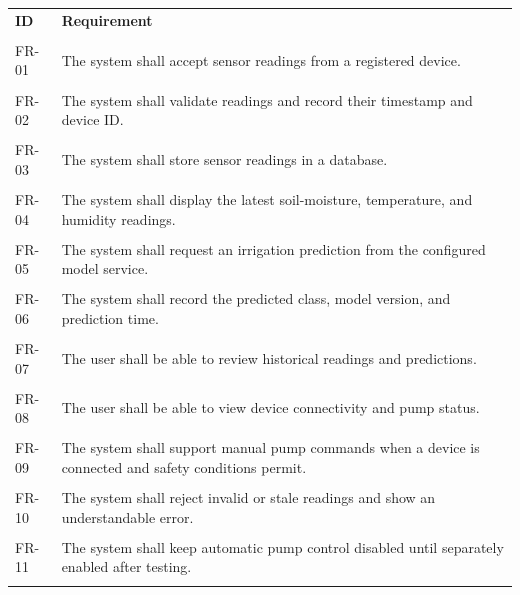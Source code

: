 \documentclass[12pt,a4paper]{report}
\begin{document}
\begin{longtable}{p{}p{}}

\toprule

\textbf{ID} & \textbf{Requirement}\\\\

\midrule

FR-01 & The system shall accept sensor readings from a registered device.\\\\

FR-02 & The system shall validate readings and record their timestamp and device ID.\\\\

FR-03 & The system shall store sensor readings in a database.\\\\

FR-04 & The system shall display the latest soil-moisture, temperature, and humidity readings.\\\\

FR-05 & The system shall request an irrigation prediction from the configured model service.\\\\

FR-06 & The system shall record the predicted class, model version, and prediction time.\\\\

FR-07 & The user shall be able to review historical readings and predictions.\\\\

FR-08 & The user shall be able to view device connectivity and pump status.\\\\

FR-09 & The system shall support manual pump commands when a device is connected and safety conditions permit.\\\\

FR-10 & The system shall reject invalid or stale readings and show an understandable error.\\\\

FR-11 & The system shall keep automatic pump control disabled until separately enabled after testing.\\\\

\bottomrule

\end{longtable}
\end{document}
